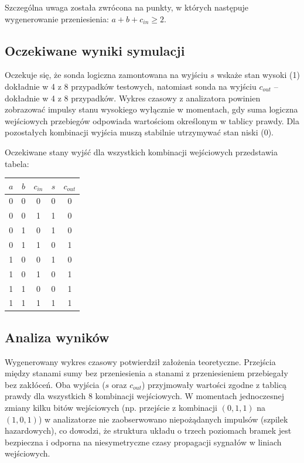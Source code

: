 Szczególna uwaga została zwrócona na punkty, w których następuje wygenerowanie przeniesienia: $a + b + c_{in} \geq 2$.

\subsection{Oczekiwane wyniki symulacji}

Oczekuje się, że sonda logiczna zamontowana na wyjściu $s$ wskaże stan wysoki (1) dokładnie w 4 z 8 przypadków testowych, natomiast sonda na wyjściu $c_{out}$ -- dokładnie w 4 z 8 przypadków. Wykres czasowy z analizatora powinien zobrazować impulsy stanu wysokiego wyłącznie w momentach, gdy suma logiczna wejściowych przebiegów odpowiada wartościom określonym w tablicy prawdy. Dla pozostałych kombinacji wyjścia muszą stabilnie utrzymywać stan niski (0).

Oczekiwane stany wyjść dla wszystkich kombinacji wejściowych przedstawia tabela:

\begin{center}
\begin{tabular}{|c|c|c|c|c|}
\hline
$a$ & $b$ & $c_{in}$ & $s$ & $c_{out}$ \\
\hline
0 & 0 & 0 & 0 & 0 \\
0 & 0 & 1 & 1 & 0 \\
0 & 1 & 0 & 1 & 0 \\
0 & 1 & 1 & 0 & 1 \\
1 & 0 & 0 & 1 & 0 \\
1 & 0 & 1 & 0 & 1 \\
1 & 1 & 0 & 0 & 1 \\
1 & 1 & 1 & 1 & 1 \\
\hline
\end{tabular}
\end{center}

\subsection{Analiza wyników}

Wygenerowany wykres czasowy potwierdził założenia teoretyczne. Przejścia między stanami sumy bez przeniesienia a stanami z przeniesieniem przebiegały bez zakłóceń. Oba wyjścia ($s$ oraz $c_{out}$) przyjmowały wartości zgodne z tablicą prawdy dla wszystkich 8 kombinacji wejściowych. W momentach jednoczesnej zmiany kilku bitów wejściowych (np. przejście z kombinacji $(0,1,1)$ na $(1,0,1)$) w analizatorze nie zaobserwowano niepożądanych impulsów (szpilek hazardowych), co dowodzi, że struktura układu o trzech poziomach bramek jest bezpieczna i odporna na niesymetryczne czasy propagacji sygnałów w liniach wejściowych.

